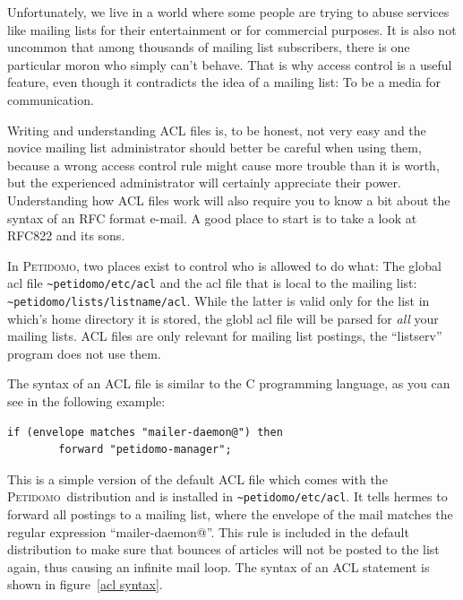 \documentclass[a4paper]{report}
\newcommand{\Petidomo}{{\scshape Peti\-domo}}
\newcommand{\file}[1]{{\tt #1}}
\newcommand{\Index}[1]{#1\index{#1}}
\begin{document}
Unfortunately, we live in a world where some people are trying to
abuse services like mailing lists for their entertainment or for
commercial purposes. It is also not uncommon that among thousands of
mailing list subscribers, there is one particular moron who simply
can't behave. That is why access control is a useful feature, even
though it contradicts the idea of a mailing list: To be a media for
communication.

Writing and understanding ACL files is, to be honest, not very easy
and the novice mailing list administrator should better be careful
when using them, because a wrong access control rule might cause more
trouble than it is worth, but the experienced administrator will
certainly appreciate their power. Understanding how ACL files work
will also require you to know a bit about the syntax of an RFC format
e-mail. A good place to start is to take a look at RFC822 and its
sons.

In \Petidomo, two places exist to control who is allowed to do what:
The global acl file
\file{\~{}petidomo/etc/acl} and the acl
file that is local to the mailing list:
\file{\~{}petidomo/lists/listname/acl}. While the latter is valid only
for the list in which's home directory it is stored, the globl acl
file will be parsed for \emph{all} your mailing lists. ACL files are
only relevant for mailing list postings, the ``listserv'' program does
not use them.

The syntax of an \Index{ACL file} is similar to the C programming
language, as you can see in the following example:
\begin{verbatim}
if (envelope matches "mailer-daemon@") then
        forward "petidomo-manager";
\end{verbatim}

This is a simple version of the default ACL file which comes with the
\Petidomo\ distribution and is installed in
\file{\~{}petidomo/etc/acl}. It tells hermes to forward all postings
to a mailing list, where the envelope of the mail matches the regular
expression ``mailer-daemon@''. This rule is included in the default
distribution to make sure that bounces of articles will not be posted
to the list again, thus causing an infinite mail loop. The syntax of
an ACL statement is shown in figure~\ref{acl syntax}.
\end{document}

